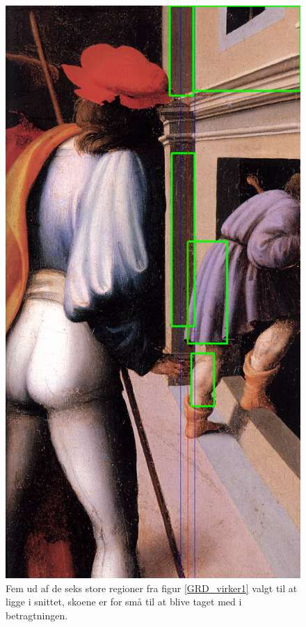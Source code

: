 \begin{figure}[h!!]
	\begin{center}
		\includegraphics[scale=0.3,angle=0]{afsnit/afprovning/billeder/naive_losning/naiv_kfarver_sdetaljer.png}
	\end{center}
	\caption[]{Fem ud af de seks store regioner fra figur
	\ref{GRD_virker1} valgt til at ligge i snittet, skoene er for små til
	at blive taget med i betragtningen.}
	\label{naiv_kfarver_sdetaljer}
\end{figure}

